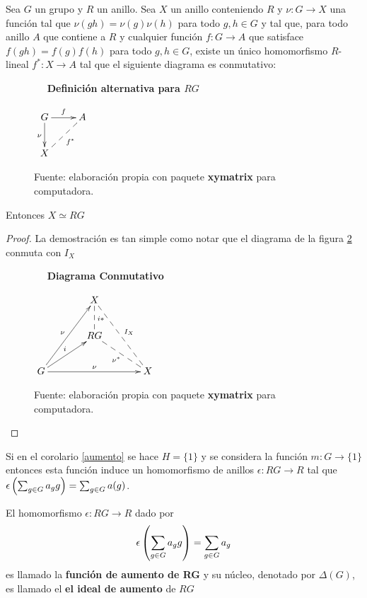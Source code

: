 \begin{proposicion}
Sea $G$ un grupo y $R$ un anillo. Sea $X$ un anillo conteniendo $R$ y $\nu \colon G \to X$ una función tal que $\nu (gh) = \nu(g)\nu(h)$ para todo $g,h \in G$ y tal que, para todo anillo $A$ que contiene a $R$ y cualquier función $f \colon G \to A$ que satisface $f(gh) = f(g)f(h)$ para todo $g, h \in G$, existe un único homomorfismo $R$-lineal $f^* \colon X \to A$ tal que el siguiente diagrama es conmutativo: 

\begin{figure}[h!]
\caption{$\quad$ \textbf{Definición alternativa para $RG$}}
\centering
$\xymatrix { G \ar[r]^f 
\ar[d]_{\nu}
 & A\\
X \ar@{ --}[ru]_{f^*} & }$
\caption*{Fuente: elaboración propia con paquete \textbf{xymatrix} para computadora.}
\label{fig:alternativa para RG}
\end{figure}


Entonces $X \simeq RG$
\end{proposicion}


\begin{proof}
La demostración es tan simple como notar que el  diagrama de la figura \ref{fig:categorias} conmuta con $I_X$

\begin{figure}[h!]
\caption{$\quad$ \textbf{Diagrama Conmutativo}}
\centering
$\xymatrix @!0 @R=3pc @C=4.5pc { & X \ar@{--}[d]^{i*} \ar@{ --}^{I_X}[ddr] \\ & RG \ar@{--}_{\nu^*}[rd] & \\ G \ar[ruu]^{\nu} \ar[ru]^{i} \ar[rr]^{\nu}& & X}$
\caption*{Fuente: elaboración propia con paquete \textbf{xymatrix} para computadora.}
\label{fig:categorias}
\end{figure}
 
\qedhere
\end{proof}

\begin{nota}
Si en el corolario \ref{aumento} se hace $H=\{1\}$ y se considera la función $m \colon G \to \{1\}$ entonces esta función induce un homomorfismo de anillos $\epsilon \colon RG \to R$ tal que $\epsilon\left(\sum_{g \in G} a_{g} g\right) = \sum_{g \in G} a(g)$. 
\end{nota}

\begin{definicion}
El homomorfismo $\epsilon \colon RG \to R$ dado por \[ \epsilon \left( \sum_{g \in G} a_{g} g\right) = \sum_{g \in G}a_g \] es llamado la \textbf{ función de aumento de RG} y su núcleo, denotado por $\Delta (G)$, es llamado el \textbf{el ideal de aumento} de $RG$
\end{definicion}


